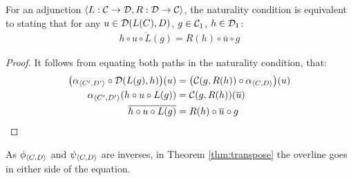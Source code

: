 \begin{theorem}
  For an adjunction $\langle L: \mathcal{C}\to \mathcal{D}, R:\mathcal{D}\to \mathcal{C}\rangle$, the naturality condition is
  equivalent to stating that for any $u\in \mathcal{D}(L(C), D)$, $g \in \mathcal{C}_1$,
  $h\in \mathcal{D}_1$:
  \begin{align*}
    \overline{h\circ u \circ L(g)} = R(h) \circ \overline{u} \circ g
  \end{align*}

  \begin{proof}
    It follows from equating both paths in the naturality condition, that:
    \[
      \begin{aligned}
      \big(\alpha_{\langle C', D'\rangle} \circ \mathcal{D}(L(g), h)\big)(u)
        &= \big(\mathcal{C}(g, R(h)) \circ \alpha_{\langle C, D\rangle}\big)(u)\\
      \alpha_{\langle C', D'\rangle}(h\circ u \circ L(g))
        &= \mathcal{C}(g, R(h))(\overline{u})\\
      \overline{h\circ u \circ L(g)}
        &= R(h) \circ \overline{u} \circ g
      \end{aligned}
    \]
  \end{proof}
  \vspace{-\baselineskip}
\end{theorem}

\begin{remark}
  As $\phi_{\langle C, D\rangle}$ and $\psi_{\langle C, D\rangle}$ are inverses, in Theorem
  \ref{thm:transpose} the overline goes in either side of the equation.
\end{remark}

